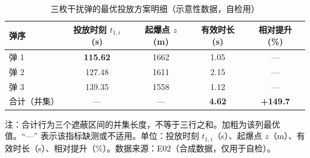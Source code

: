 \begin{table}[htbp]
  \centering
  \caption{三枚干扰弹的最优投放方案明细（示意性数据，自检用）}
  \label{tab:selfcheck}
  \small
  \begin{tabular}{@{}l S[table-format=3.2] S[table-format=4.0] S[table-format=1.2] S[table-format=4.1]@{}}
    \toprule
    弹序 & {投放时刻 $t_{1,i}$ (s)} & {起爆点 $z$ (m)} & {有效时长 (s)} & {相对提升 (\%)} \\
    \midrule
    弹 1 & \bfseries 115.62 & 1662 & 1.05 &  \\
    弹 2 & 127.48 & 1611 & 2.15 &  \\
    弹 3 & 139.35 & 1558 & 1.12 &  \\
    合计（并集） &  &  & \bfseries 4.62 & \bfseries +149.7 \\
    \bottomrule
  \end{tabular}

  \vspace{2pt}
  {\footnotesize 注：合计行为三个遮蔽区间的并集长度，不等于三行之和。加粗为该列最优值。``—'' 表示该指标缺测或不适用。单位：投放时刻 $t_{1,i}$（s）、起爆点 $z$（m）、有效时长（s）、相对提升（\%）。数据来源：E02（合成数据，仅用于自检）。}
\end{table}
